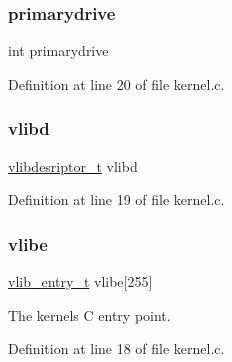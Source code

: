\subsubsection{\texorpdfstring{primarydrive}{primarydrive}}
{\footnotesize\ttfamily int primarydrive}



Definition at line 20 of file kernel.\+c.

\mbox{\label{a00068_a2125beec541d04796805161dbec05fcf_a2125beec541d04796805161dbec05fcf}} 
\subsubsection{\texorpdfstring{vlibd}{vlibd}}
{\footnotesize\ttfamily \hyperlink{a00194_a2d9000b4fbb25c5ed2950a2d8f4921d5_a2d9000b4fbb25c5ed2950a2d8f4921d5}{vlibdesriptor\+\_\+t} vlibd}



Definition at line 19 of file kernel.\+c.

\mbox{\label{a00068_af69f4f709fdab28dec6b8fb75fb4d526_af69f4f709fdab28dec6b8fb75fb4d526}} 
\subsubsection{\texorpdfstring{vlibe}{vlibe}}
{\footnotesize\ttfamily \hyperlink{a00194_a97c1a7136f2ab06368e93c2d7533d619_a97c1a7136f2ab06368e93c2d7533d619}{vlib\+\_\+entry\+\_\+t} vlibe\mbox{[}255\mbox{]}}



The kernels C entry point. 



Definition at line 18 of file kernel.\+c.

